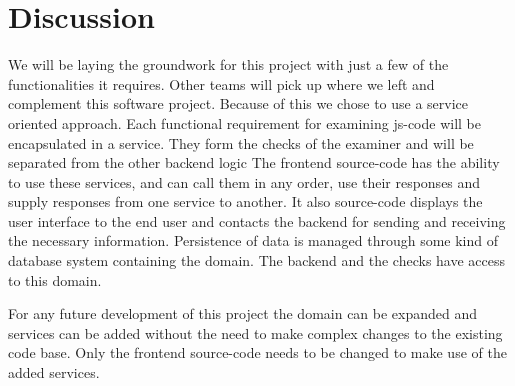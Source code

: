 \section{Discussion}
We will be laying the groundwork for this project
with just a few of the functionalities it requires.
Other teams will pick up where we left and complement this software project.
Because of this we chose to use a service oriented approach.
Each functional requirement for examining \gls{js-code}
will be encapsulated in a service.
They form the \glspl{check} of the \gls{examiner}
and will be separated from the other backend logic
The frontend \gls{source-code} has the ability to use these services,
and can call them in any order, use their responses
and supply responses from one service to another.
It also \gls{source-code} displays the user interface to the end user
and contacts the backend for sending and receiving the necessary information.
Persistence of data is managed through some kind of database system
containing the domain.
The backend and the \glspl{check} have access to this domain.

For any future development of this project
the domain can be expanded
and services can be added
without the need to make complex changes to the existing code base.
Only the frontend \gls{source-code} needs to be changed
to make use of the added services.
